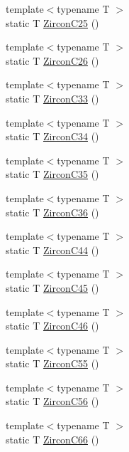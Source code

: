 \begin{DoxyCompactItemize}
\item 
{\footnotesize template$<$typename T $>$ }\\static T \mbox{\hyperlink{namespacempc_1_1data_a146401f3325117c83e1a826dce7468b4}{Zircon\+C25}} ()
\item 
{\footnotesize template$<$typename T $>$ }\\static T \mbox{\hyperlink{namespacempc_1_1data_aee1b4e21b304eaf673a42ec3ac72d312}{Zircon\+C26}} ()
\item 
{\footnotesize template$<$typename T $>$ }\\static T \mbox{\hyperlink{namespacempc_1_1data_ac37e71ded14d5d24a6a2c0c7803eab39}{Zircon\+C33}} ()
\item 
{\footnotesize template$<$typename T $>$ }\\static T \mbox{\hyperlink{namespacempc_1_1data_a4e31283b4a6d3fa5ad26a53eaadb5330}{Zircon\+C34}} ()
\item 
{\footnotesize template$<$typename T $>$ }\\static T \mbox{\hyperlink{namespacempc_1_1data_a3a82c293a9526870aa7dffe6ded7b2b1}{Zircon\+C35}} ()
\item 
{\footnotesize template$<$typename T $>$ }\\static T \mbox{\hyperlink{namespacempc_1_1data_a9d6f73e96cf44ec1391190234855f0ce}{Zircon\+C36}} ()
\item 
{\footnotesize template$<$typename T $>$ }\\static T \mbox{\hyperlink{namespacempc_1_1data_a937ae006b9c84067fcf98c385bf33c06}{Zircon\+C44}} ()
\item 
{\footnotesize template$<$typename T $>$ }\\static T \mbox{\hyperlink{namespacempc_1_1data_afefea480867b1560a1febbea727088a9}{Zircon\+C45}} ()
\item 
{\footnotesize template$<$typename T $>$ }\\static T \mbox{\hyperlink{namespacempc_1_1data_abb777896f88ab698f65fda80ede60de9}{Zircon\+C46}} ()
\item 
{\footnotesize template$<$typename T $>$ }\\static T \mbox{\hyperlink{namespacempc_1_1data_ae6357a63242ae47b84d3ad8f9207f610}{Zircon\+C55}} ()
\item 
{\footnotesize template$<$typename T $>$ }\\static T \mbox{\hyperlink{namespacempc_1_1data_a3fd070df54142d3ff440f675f237c1da}{Zircon\+C56}} ()
\item 
{\footnotesize template$<$typename T $>$ }\\static T \mbox{\hyperlink{namespacempc_1_1data_a3d72e76a0a038fba393d95bc3d12ef4a}{Zircon\+C66}} ()

\end{DoxyCompactItemize}
